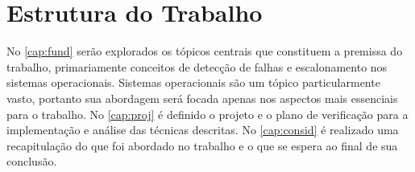 \section{Estrutura do Trabalho}

No \autoref{cap:fund} serão explorados os tópicos centrais que constituem a premissa do trabalho, primariamente conceitos de detecção de falhas e escalonamento nos sistemas operacionais. Sistemas operacionais são um tópico particularmente vasto, portanto sua abordagem será focada apenas nos aspectos mais essenciais para o trabalho. No \autoref{cap:proj} é definido o projeto e o plano de verificação para a implementação e análise das técnicas descritas. No \autoref{cap:consid} é realizado uma recapitulação do que foi abordado no trabalho e o que se espera ao final de sua conclusão.


